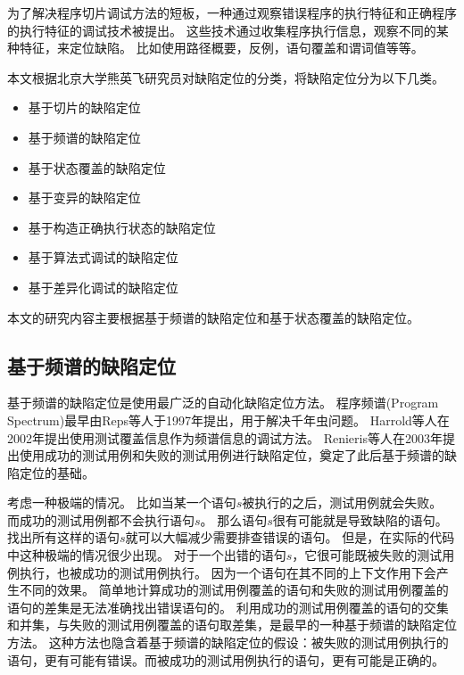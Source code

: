 为了解决程序切片调试方法的短板，一种通过观察错误程序的执行特征和正确程序的执行特征的调试技术被提出。
这些技术通过收集程序执行信息，观察不同的某种特征，来定位缺陷。
比如使用路径概要\parencite{Reps1997The}，反例\parencite{Ball2003From,Groce2004Understanding}，语句覆盖\parencite{Jones2002Visualization}和谓词值\parencite{Liblit2005Scalable,Liu2005SOBER}等等。

本文根据北京大学熊英飞研究员对缺陷定位的分类\parencite{YingfeiFL}，将缺陷定位分为以下几类。

\begin{itemize}
\item 基于切片的缺陷定位
\item 基于频谱的缺陷定位
\item 基于状态覆盖的缺陷定位
\item 基于变异的缺陷定位
\item 基于构造正确执行状态的缺陷定位
\item 基于算法式调试的缺陷定位
\item 基于差异化调试的缺陷定位
\end{itemize}

本文的研究内容主要根据基于频谱的缺陷定位和基于状态覆盖的缺陷定位。

\subsection{基于频谱的缺陷定位}

基于频谱的缺陷定位是使用最广泛的自动化缺陷定位方法\parencite{YingfeiFL}。
程序频谱(Program Spectrum)最早由Reps等人于1997年提出\parencite{Reps1997The}，用于解决千年虫问题。
Harrold等人在2002年\parencite{Harrold2000An}提出使用测试覆盖信息作为频谱信息的调试方法。
Renieris等人在2003年提出使用成功的测试用例和失败的测试用例进行缺陷定位\parencite{Renieres2003Fault}，奠定了此后基于频谱的缺陷定位的基础。

考虑一种极端的情况。
比如当某一个语句$s$被执行的之后，测试用例就会失败。
而成功的测试用例都不会执行语句$s$。
那么语句$s$很有可能就是导致缺陷的语句。
找出所有这样的语句$s$就可以大幅减少需要排查错误的语句。
但是，在实际的代码中这种极端的情况很少出现。
对于一个出错的语句$s$，它很可能既被失败的测试用例执行，也被成功的测试用例执行。
因为一个语句在其不同的上下文作用下会产生不同的效果。
简单地计算成功的测试用例覆盖的语句和失败的测试用例覆盖的语句的差集是无法准确找出错误语句的。
利用成功的测试用例覆盖的语句的交集和并集，与失败的测试用例覆盖的语句取差集，是最早的一种基于频谱的缺陷定位方法\parencite{Renieres2003Fault}。
这种方法也隐含着基于频谱的缺陷定位的假设：被失败的测试用例执行的语句，更有可能有错误。而被成功的测试用例执行的语句，更有可能是正确的。

